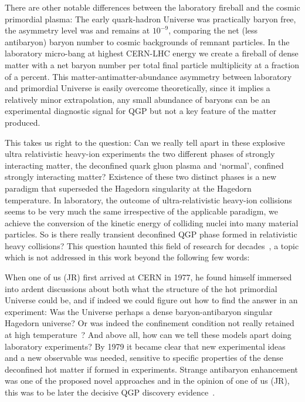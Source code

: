 There are other notable differences between the laboratory fireball and the cosmic primordial plasma: The early quark-hadron Universe was practically baryon free, the asymmetry level was and remains at $10^{-9}$, comparing the net (less antibaryon) baryon number to cosmic backgrounds of remnant particles. In the laboratory micro-bang at highest CERN-LHC energy we create a fireball of dense matter with a net baryon number per total final particle multiplicity at a fraction of a percent. This matter-antimatter-abundance asymmetry between laboratory and primordial Universe is easily overcome theoretically, since it implies a relatively minor extrapolation, any small abundance of baryons can be an experimental diagnostic signal for QGP but not a key feature of the matter produced.

This takes us right to the question: Can we really tell apart in these explosive ultra relativistic heavy-ion experiments the two different phases of strongly interacting matter, the deconfined quark gluon plasma and `normal', confined strongly interacting matter? Existence of these two distinct phases is a new paradigm that superseded the Hagedorn singularity at the Hagedorn temperature. In laboratory, the outcome of ultra-relativistic heavy-ion collisions seems to be very much the same irrespective of the applicable paradigm, we achieve the conversion of the kinetic energy of colliding nuclei into many material particles. So is there really transient deconfined QGP phase formed in relativistic heavy collisions? This question haunted this field of research for decades~\cite{Rafelski:2015cxa,Harris:2024aov}, a topic which is not addressed in this work beyond the following few words: 

When one of us (JR) first arrived at CERN in 1977, he found himself immersed into ardent discussions about both what the structure of the hot primordial Universe could be, and if indeed we could figure out how to find the answer in an experiment: Was the Universe perhaps a dense baryon-antibaryon singular Hagedorn universe? Or was indeed the confinement condition not really retained at high temperature~\cite{Weinberg:1974hy,Harrington:1974fc,Cabibbo:1975ig}? And above all, how can we tell these models apart doing laboratory experiments? By 1979 it became clear that new experimental ideas and a new observable was needed, sensitive to specific properties of the dense deconfined hot matter if formed in experiments. Strange antibaryon enhancement was one of the proposed novel approaches and in the opinion of one of us (JR), this was to be later the decisive QGP discovery evidence~\cite{Rafelski:2019twp}.


